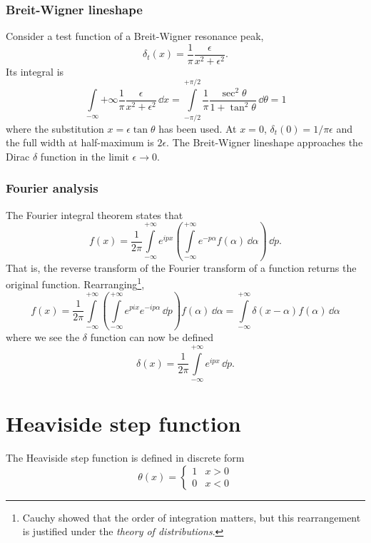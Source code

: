 \documentclass{report}
\begin{document}
\subsubsection{Breit-Wigner lineshape}
Consider a test function of a Breit-Wigner resonance peak,
\begin{equation}
\delta_t(x) = \frac{1}{\pi} \frac{\epsilon}{x^2 + \epsilon^2}.
\end{equation}
Its integral is
\begin{equation}
\int\limits_{-\infty}{+\infty} \frac{1}{\pi} \frac{\epsilon}{x^2 + \epsilon^2} \, \dd{x} = \int\limits_{-{\pi}/{2}}^{+{\pi}/{2}} \frac{1}{\pi} \frac{\sec^2{\theta}}{1+\tan^2{\theta}} \, \dd{\theta} = 1
\end{equation}
where the substitution $x = \epsilon \tan \theta$ has been used. At $x=0$, $\delta_t(0) = 1/\pi\epsilon$ and the full width at half-maximum is $2\epsilon$. The Breit-Wigner lineshape approaches the Dirac $\delta$ function in the limit $\epsilon\rightarrow 0$.

\subsubsection{Fourier analysis}
The Fourier integral theorem states that
\begin{equation}
f(x) = \frac{1}{2\pi} \int\limits_{-\infty}^{+\infty} e^{ipx} \left( \int\limits_{-\infty}^{+\infty} e^{-p\alpha} f(\alpha) \, \dd{\alpha} \right) \, \dd{p}.
\end{equation}
That is, the reverse transform of the Fourier transform of a function returns the original function. Rearranging\footnote{Cauchy showed that the order of integration matters, but this rearrangement is justified under the \emph{theory of distributions}.},
\begin{equation}
f(x) = \frac{1}{2\pi} \int\limits_{-\infty}^{+\infty} \left( \int\limits_{-\infty}^{+\infty} e^{pix} e^{-ip\alpha} \, \dd{p} \right) f(\alpha) \, \dd{\alpha} = \int\limits_{-\infty}^{+\infty} \delta(x-\alpha) f(\alpha) \, \dd{\alpha}
\end{equation}
where we see the $\delta$ function can now be defined
\begin{equation}
\delta(x) = \frac{1}{2\pi} \int\limits_{-\infty}^{+\infty} e^{ipx} \, \dd{p}.
\end{equation}

\section{Heaviside step function}
The Heaviside step function is defined in discrete form
\begin{equation}
\theta(x) = 
\begin{cases}
1 & x > 0 \\
0 & x < 0
\end{cases}
\end{equation}
\end{document}
